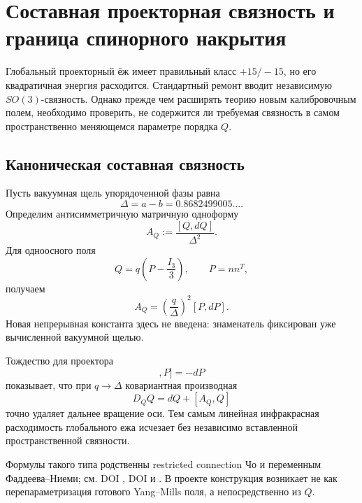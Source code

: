 \chapter{Составная проекторная связность и граница спинорного накрытия}

Глобальный проекторный ёж имеет правильный класс $+15/-15$, но его
квадратичная энергия расходится. Стандартный ремонт вводит независимую
$SO(3)$-связность. Однако прежде чем расширять теорию новым калибровочным полем,
необходимо проверить, не содержится ли требуемая связность в самом
пространственно меняющемся параметре порядка $Q$.

\section{Каноническая составная связность}

Пусть вакуумная щель упорядоченной фазы равна
\begin{equation}
 \Delta=a-b=0.8682499005\ldots.
\end{equation}
Определим антисимметричную матричную одноформу
\begin{equation}
 A_Q:=\frac{[Q,dQ]}{\Delta^2}.
 \label{eq:v6-composite-projector-connection}
\end{equation}
Для одноосного поля
\begin{equation}
 Q=q\left(P-\frac{I_3}{3}\right),
 \qquad P=nn^T,
\end{equation}
получаем
\begin{equation}
 A_Q=\left(\frac q\Delta\right)^2[P,dP].
 \label{eq:v6-composite-uniaxial-connection}
\end{equation}
Новая непрерывная константа здесь не введена: знаменатель фиксирован уже
вычисленной вакуумной щелью.

Тождество для проектора
\begin{equation}
 [[P,dP],P]=-dP
\end{equation}
показывает, что при $q\to\Delta$ ковариантная производная
\begin{equation}
 D_QQ=dQ+[A_Q,Q]
\end{equation}
точно удаляет дальнее вращение оси. Тем самым линейная инфракрасная
расходимость глобального ежа исчезает без независимо вставленной
пространственной связности.

Формулы такого типа родственны restricted connection Чо и переменным
Фаддеева--Ниеми; см. DOI , DOI
 и
. В проекте конструкция возникает не как
перепараметризация готового Yang--Mills поля, а непосредственно из $Q$.

